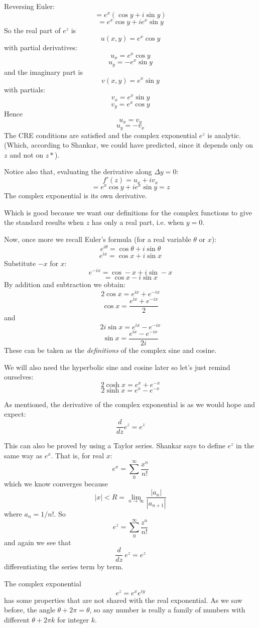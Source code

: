 \documentclass[11pt, oneside]{article}   	%
\begin{document}
Reversing Euler:
\[ = e^x (\cos y + i \sin y) \]
\[ = e^x \cos y + i e^x \sin y \]
So the real part of $e^z$ is 
\[ u(x,y) = e^x \cos y \]
with partial derivatives:
\[ u_x = e^x \cos y \]
\[ u_y = - e^x \sin y \]
and the imaginary part is
\[ v(x,y) = e^x \sin y \]
with partials:
\[ v_x = e^x \sin y \]
\[ v_y = e^x \cos y \]
Hence
\[ u_x = v_y \]
\[ u_y = - v_x \]
The CRE conditions are satisfied and the complex exponential $e^z$ is analytic.  (Which, according to Shankar, we could have predicted, since it depends only on $z$ and not on $z*$).

Notice also that, evaluating the derivative along $\Delta y =0$:
\[ f'(z) = u_x + iv_x  \]
\[ = e^x \cos y + i e^x \sin y = z \]
The complex exponential is its own derivative.

Which is good because we want our definitions for the complex functions to give the standard results when $z$ has only a real part, i.e. when $y=0$.

Now, once more we recall Euler's formula (for a real variable $\theta$ or $x$):
\[ e^{i \theta} = \cos \theta + i \sin \theta \]
\[ e^{i x} = \cos x + i \sin x \]
Substitute $-x$ for $x$:
\[ e^{-i x} = \cos -x + i \sin -x \]
\[ = \cos x - i \sin x \]
By addition and subtraction we obtain:
\[ 2 \cos x = e^{i x} + e^{-i x} \]
\[ \cos x = \frac{e^{i x} + e^{-i x}}{2} \]
and
\[ 2i \sin x = e^{i x} - e^{-i x} \]
\[ \sin x = \frac{e^{i x} - e^{-i x}}{2i} \]
These can be taken as the \emph{definitions} of the complex sine and cosine.

We will also need the hyperbolic sine and cosine later so let's just remind ourselves:
\[ 2 \cosh x = e^x + e^{-x} \]
\[ 2 \sinh x = e^x - e^{-x} \]

As mentioned, the derivative of the complex exponential is as we would hope and expect:
\[ \frac{d}{dz} e^z = e^z \]

This can also be proved by using a Taylor series.  Shankar says to define $e^z$ in the same way as $e^x$.  That is, for real $x$:
\[ e^x = \sum_0^{\infty} \frac{x^n}{n!} \]
which we know converges because
\[ |x| < R = \lim_{n \rightarrow \infty} \frac{|a_n|}{|a_{n+1}|} \]
where $a_n = 1/n!$.  So
\[ e^z = \sum_0^{\infty} \frac{z^n}{n!} \]
and again we see that 
\[ \frac{d}{dz} \ e^z = e^z \]
differentiating the series term by term.

The complex exponential 
\[ e^z = e^x e^{iy} \]
has some properties that are not shared with the real exponential.  As we saw before, the angle $\theta + 2 \pi = \theta$, so any number is really a family of numbers with different $\theta + 2 \pi k$ for integer $k$.
\end{document}
